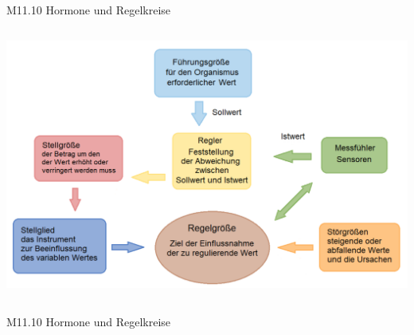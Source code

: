 \documentclass{beamer}
\begin{document}
\begin{frame}{M11.10 Hormone und Regelkreise}
\begin{columns}[c]
\begin{column}{5cm}
\begin{center}
    \includegraphics[width=\textwidth]{regelkreis.png}
\end{center}

\end{column}


\end{columns}

    
\end{frame}


\begin{frame}{M11.10 Hormone und Regelkreise}

\end{frame}








\end{document}
